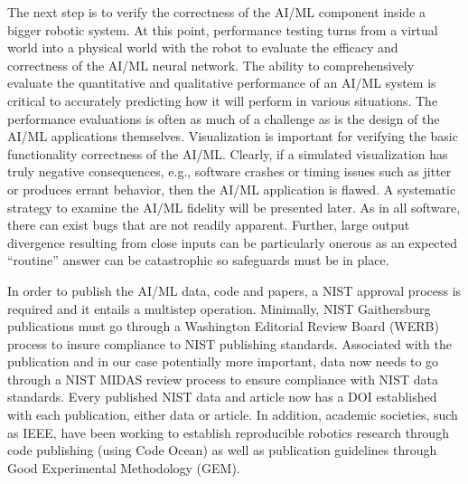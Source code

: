 The next step is to verify the correctness of the AI/ML component inside a bigger robotic system.
At this point, performance testing turns from a virtual world into a physical world  with the robot to  evaluate the efficacy and correctness of the AI/ML neural network. The ability to comprehensively evaluate the quantitative and qualitative performance of an AI/ML system is critical to accurately predicting how it will perform in various situations. The performance evaluations is often as much of a challenge as is the design of the AI/ML applications themselves. Visualization is important for verifying the basic functionality correctness of the AI/ML. Clearly, if a simulated visualization has truly negative consequences, e.g., software crashes or timing issues such as jitter or produces errant behavior, then the AI/ML application is flawed. A systematic strategy to examine the AI/ML fidelity will be presented later. As in all software, there can exist bugs that are not readily apparent. Further, large output divergence resulting from close inputs can be particularly onerous as an expected ``routine'' answer can be catastrophic so safeguards must be in place.


In order to publish the AI/ML data, code and papers, a NIST approval process is required and it entails a multistep operation. Minimally, NIST Gaithersburg publications must go through a Washington Editorial Review Board (WERB) process to insure compliance to NIST publishing standards. Associated with the publication and in our case potentially more important, data now needs to go through a NIST MIDAS review process to ensure compliance with NIST data standards.  Every published NIST data and article now has a DOI established with each publication, either data or article. In addition, academic societies, such as IEEE,  have been working to establish reproducible robotics research through code publishing (using Code Ocean) as well as publication guidelines through Good Experimental Methodology (GEM). 





